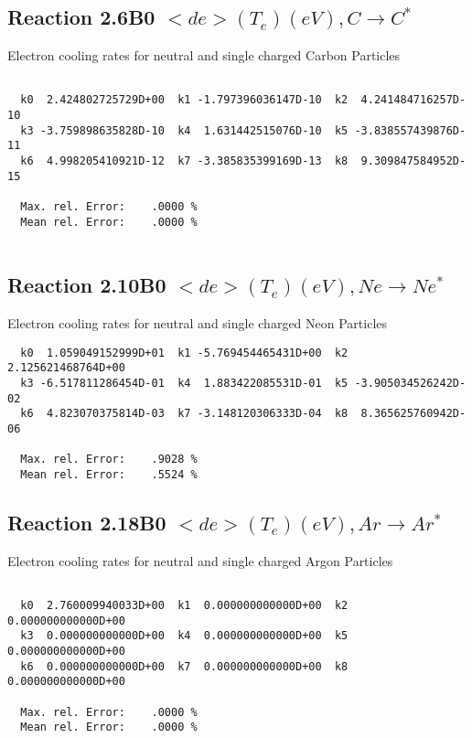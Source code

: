 \subsection{
Reaction 2.6B0   $ <de>(T_e)  (eV), C \rightarrow C^* $
}

 Electron cooling rates for neutral and single
 charged Carbon Particles

\begin{verbatim}

  k0  2.424802725729D+00  k1 -1.797396036147D-10  k2  4.241484716257D-10
  k3 -3.759898635828D-10  k4  1.631442515076D-10  k5 -3.838557439876D-11
  k6  4.998205410921D-12  k7 -3.385835399169D-13  k8  9.309847584952D-15

  Max. rel. Error:    .0000 %
  Mean rel. Error:    .0000 %


\end{verbatim}

\subsection{
Reaction 2.10B0   $ <de>(T_e)  (eV), Ne \rightarrow Ne^* $
}

 Electron cooling rates for neutral and single
 charged Neon Particles

\begin{verbatim}
  k0  1.059049152999D+01  k1 -5.769454465431D+00  k2  2.125621468764D+00
  k3 -6.517811286454D-01  k4  1.883422085531D-01  k5 -3.905034526242D-02
  k6  4.823070375814D-03  k7 -3.148120306333D-04  k8  8.365625760942D-06

  Max. rel. Error:    .9028 %
  Mean rel. Error:    .5524 %

\end{verbatim}


\subsection{
Reaction 2.18B0  $  <de>(T_e)  (eV), Ar \rightarrow Ar^*$
}

  Electron cooling rates for neutral and single
  charged Argon Particles

\begin{verbatim}

  k0  2.760009940033D+00  k1  0.000000000000D+00  k2  0.000000000000D+00
  k3  0.000000000000D+00  k4  0.000000000000D+00  k5  0.000000000000D+00
  k6  0.000000000000D+00  k7  0.000000000000D+00  k8  0.000000000000D+00

  Max. rel. Error:    .0000 %
  Mean rel. Error:    .0000 %

\end{verbatim}


